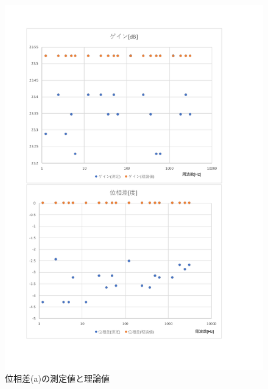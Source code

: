 \documentclass[uplatex, 11pt,a4j, titlepage]{jsarticle}
\begin{document}
\begin{figure}[h]
    \centering
    \includegraphics[width=12cm]{ideal_plot4.pdf}
    \caption{位相差(a)の測定値と理論値}
    \label{ideal_plot4}
\end{figure}
\end{document}
